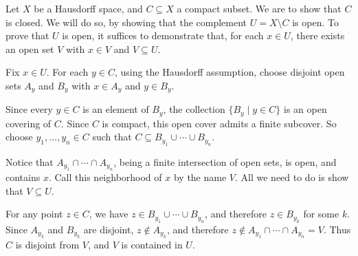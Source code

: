 \documentclass[12pt]{article}
\begin{document}
Let $X$ be a Hausdorff space, and $C \subseteq X$ a compact subset.
We are to show that $C$ is closed.
We will do so, by showing that the complement $U = X \setminus C$ is open.
To prove that $U$ is open, it suffices to demonstrate that,
for each $x \in U$,
there exists an open set $V$ with $x \in V$ and $V \subseteq U$.

Fix $x \in U$.
For each $y \in C$, using the Hausdorff assumption,
choose disjoint open sets $A_y$ and $B_y$ with $x \in A_y$ and $y \in B_y$.

Since every $y \in C$ is an element of $B_y$,
the collection $\{B_y \mid y \in C\}$ is an open covering of $C$.
Since $C$ is compact, this open cover admits a finite subcover.
So choose $y_1, \ldots, y_n \in C$ such that
$C \subseteq B_{y_1} \cup \cdots \cup B_{y_n}$.

Notice that $A_{y_1} \cap \cdots \cap A_{y_n}$,
being a finite intersection of open sets, is open, and contains $x$.
Call this neighborhood of $x$ by the name $V$.
All we need to do is show that $V \subseteq U$.

For any point $z \in C$, we have $z \in B_{y_1} \cup \cdots \cup B_{y_n}$,
and therefore $z \in B_{y_k}$ for some $k$.
Since $A_{y_k}$ and $B_{y_k}$ are disjoint, $z \notin A_{y_k}$,
and therefore $z \notin A_{y_1} \cap \cdots \cap A_{y_n} = V$.
Thus $C$ is disjoint from $V$, and $V$ is contained in $U$.
\end{document}
